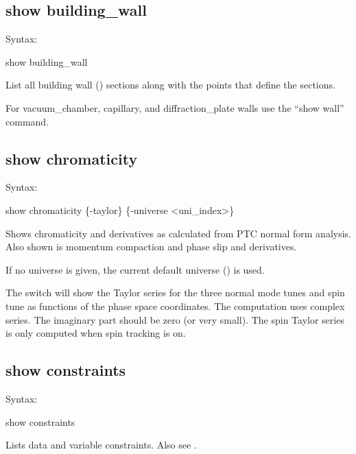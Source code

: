 {{{{{{{{\subsection{show building_wall}
\label{s:show.building}

Syntax:
\begin{example}
  show building_wall
\end{example}

List all building wall () sections along with the points that define
the sections.

For vacuum_chamber, capillary, and diffraction_plate walls use the ``show wall'' command.


\subsection{show chromaticity}
\label{s:show.chrom}

Syntax:
\begin{example}
  show chromaticity \{-taylor\} \{-universe <uni_index>\} 
\end{example}

Shows chromaticity and derivatives as calculated from PTC normal form analysis. Also shown
is momentum compaction and phase slip and derivatives.

If no universe is given, the current default universe () is used.

The  switch will show the Taylor series for the three normal mode tunes and spin tune
as functions of the phase space coordinates. The computation uses complex series. The imaginary part
should be zero (or very small). The spin Taylor series is only computed when spin tracking is on.



\subsection{show constraints}
\label{s:show.constraints}

Syntax:
\begin{example}
  show constraints
\end{example}

Lists data and variable constraints. Also see .

}}}}}}}}
